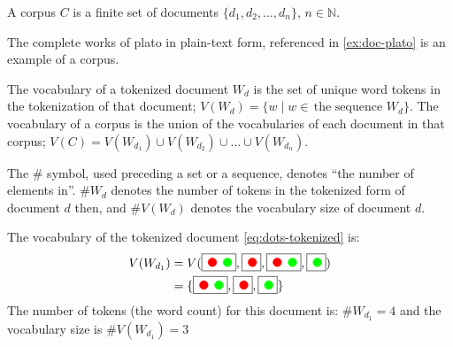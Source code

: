 \begin{definition}[Corpus]
  A corpus $C$ is a finite set of documents $\{d_1, d_2,\dots,d_n\}$, $n\in\mathbb{N}$.
\end{definition}

\begin{example}\label{ex:corp-plato}
  The complete works of plato in plain-text form, referenced in \autoref{ex:doc-plato} is an example of a corpus.
\end{example}

\begin{definition}[Vocabulary]
  The vocabulary of a tokenized document $W_d$ is the set of unique word tokens in the tokenization of that document; $V(W_d)=\{w\mid w\in\, \text{the sequence $W_d$}\}$. The vocabulary of a corpus is the union of the vocabularies of each document in that corpus; $V(C)=V(W_{d_1})\cup V(W_{d_2})\cup \dots\cup V(W_{d_n})$.
\end{definition}

\begin{definition}[$\#$ Operator]
  The $\#$ symbol, used preceding a set or a sequence, denotes ``the number of elements in''. $\#W_d$ denotes the number of tokens in the tokenized form of document $d$ then, and $\#V(W_d)$ denotes the vocabulary size of document $d$.
\end{definition}

\begin{example}
  The vocabulary of the tokenized document \eqref{eq:dots-tokenized} is:
  \begin{align*}
    V(W_{d_1})&=V(\fbox{\mycirc[red] \mycirc[green]}, \fbox{\mycirc[red]}, \fbox{\mycirc[red] \mycirc[green]}, \fbox{\mycirc[green]})\\
              &=\{\fbox{\mycirc[red] \mycirc[green]}, \fbox{\mycirc[red]}, \fbox{\mycirc[green]}\}
  \end{align*}
  The number of tokens (the word count) for this document is: $\#W_{d_1}=4$ and the vocabulary size is $\#V(W_{d_1})=3$
\end{example}


